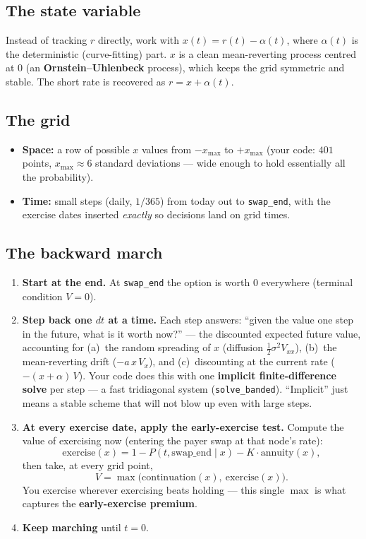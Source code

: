 \documentclass[11pt]{article}
\newcommand{\code}[1]{\texttt{#1}}
\begin{document}
\subsection{The state variable}
Instead of tracking $r$ directly, work with $x(t) = r(t) - \alpha(t)$, where $\alpha(t)$ is
the deterministic (curve-fitting) part. $x$ is a clean mean-reverting process centred at
$0$ (an \textbf{Ornstein--Uhlenbeck} process), which keeps the grid symmetric and stable.
The short rate is recovered as $r = x + \alpha(t)$.

\subsection{The grid}
\begin{itemize}[leftmargin=1.4em]
  \item \textbf{Space:} a row of possible $x$ values from $-x_{\max}$ to $+x_{\max}$ (your
        code: $401$ points, $x_{\max}\approx 6$ standard deviations --- wide enough to hold
        essentially all the probability).
  \item \textbf{Time:} small steps (daily, $1/365$) from today out to \code{swap\_end},
        with the exercise dates inserted \emph{exactly} so decisions land on grid times.
\end{itemize}

\subsection{The backward march}
\begin{enumerate}[leftmargin=1.6em]
  \item \textbf{Start at the end.} At \code{swap\_end} the option is worth $0$ everywhere
        (terminal condition $V=0$).
  \item \textbf{Step back one $dt$ at a time.} Each step answers: ``given the value one
        step in the future, what is it worth now?'' --- the discounted expected future
        value, accounting for (a)~the random spreading of $x$ (diffusion
        $\tfrac12\sigma^2 V_{xx}$), (b)~the mean-reverting drift ($-a\,x\,V_x$), and
        (c)~discounting at the current rate ($-(x+\alpha)\,V$). Your code does this with one
        \textbf{implicit finite-difference solve} per step --- a fast tridiagonal system
        (\code{solve\_banded}). ``Implicit'' just means a stable scheme that will not blow
        up even with large steps.
  \item \textbf{At every exercise date, apply the early-exercise test.} Compute the value
        of exercising now (entering the payer swap at that node's rate):
        \[
          \text{exercise}(x) = 1 - P(t,\text{swap\_end}\mid x) - K\cdot\text{annuity}(x),
        \]
        then take, at every grid point,
        \[
          V = \max\big(\text{continuation}(x),\ \text{exercise}(x)\big).
        \]
        You exercise wherever exercising beats holding --- this single $\max$ is what
        captures the \textbf{early-exercise premium}.
  \item \textbf{Keep marching} until $t=0$.
\end{enumerate}
\end{document}
